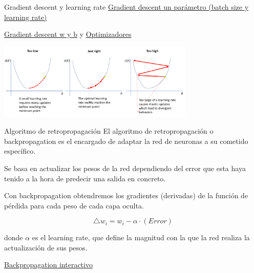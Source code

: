 \begin{frame}{Gradient descent y learning rate}
\href{https://www.deeplearning.ai/ai-notes/optimization/index.html\#learning-rate}{Gradient descent un parámetro (batch size y learning rate)}

\href{https://www.deeplearning.ai/ai-notes/optimization/index.html\#adjusting-gradient-descent-hyperparameters}{Gradient descent w y b} y \href{https://www.deeplearning.ai/ai-notes/optimization/index.html\#iterative-update}{Optimizadores}

\centering
\includegraphics[width=0.7\textwidth]{figures/Introduccion/lr.png}

\end{frame}

\begin{frame}{Algoritmo de retropropagación}
El algoritmo de \alert{retropropagación} o \alert{backpropagation} es el encargado de \alert{adaptar} la red de neuronas a su cometido específico.

Se basa en actualizar los \alert{pesos} de la red dependiendo del \alert{error} que esta haya tenido a la hora de predecir una \alert{salida} en concreto.

Con backpropagation obtendremos los \alert{gradientes (derivadas)} de la función de pérdida
para cada \alert{peso} de cada \alert{capa oculta}.

\begin{equation}
    \bigtriangleup w_i = w_i - \alpha \cdot (Error)
\end{equation}

donde $\alpha$ es el \alert{learning rate}, que define la \alert{magnitud} con la que la red realiza la \alert{actualización} de sus pesos.

\href{https://xnought.github.io/backprop-explainer/}{Backpropagation interactivo}

\end{frame}


